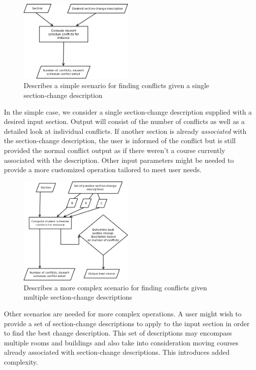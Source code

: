 \documentclass[11pt]{article}
\begin{document}
\begin{figure}[h]
  \centering
  \includegraphics[width=0.5\textwidth]{diagrams/scenarioA.png}
  \caption{Describes a simple scenario for finding conflicts given a single section-change description}
\end{figure}

In the simple case, we consider a single section-change description supplied with a desired input section. Output will consist of the
number of conflicts as well as a detailed look at individual conflicts. If another section is already \textit{associated} with the
section-change description, the user is informed of the conflict but is still provided the normal conflict output as if there weren't
a course currently associated with the description. Other input parameters might be needed to provide a more customized operation tailored
to meet user needs.

\begin{figure}[h]
  \centering
  \includegraphics[width=0.5\textwidth]{diagrams/scenarioB.png}
  \caption{Describes a more complex scenario for finding conflicts given multiple section-change descriptions}
\end{figure}

Other scenarios are needed for more complex operations. A user might wish to provide a set of section-change descriptions to apply to
the input section in order to find the best change description. This set of descriptions may encompass multiple rooms and buildings and also
take into consideration moving courses already associated with section-change descriptions. This introduces added complexity. \\
\end{document}
